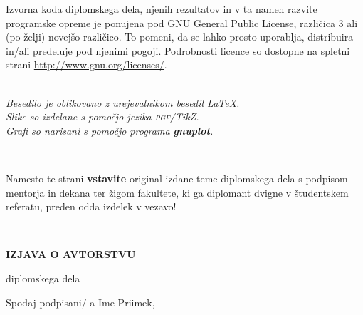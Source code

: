 \documentclass[12pt,a4paper,openany]{book}
\newcommand{\gnuplot}{\textbf{gnuplot}}
\newcommand{\pgfname}{\textsc{pgf}}
\newcommand{\tikzname}{Ti\emph{k}Z}
\begin{document}
\vspace*{1.5cm}
{\small \noindent
Izvorna koda diplomskega dela, njenih rezultatov in v ta namen razvite programske opreme je ponujena pod GNU General Public License,
različica 3 ali (po želji) novejšo različico. To pomeni, da se lahko prosto uporablja, distribuira in/ali predeluje pod njenimi pogoji.
Podrobnosti licence so dostopne na spletni strani \url{http://www.gnu.org/licenses/}.
}

\begin{center} 
\ \\ \vfill
{\em
Besedilo je oblikovano z urejevalnikom besedil \LaTeX. \\ Slike so izdelane s pomočjo jezika \pgfname/\tikzname. \\ Grafi so narisani
s pomočjo programa \gnuplot.}
\end{center}

\newpage

\ \thispagestyle{empty}

\newpage


\thispagestyle{empty}

Namesto te strani {\bf vstavite} original izdane teme diplomskega dela s podpisom mentorja in dekana ter \v zigom fakultete, ki ga diplomant
dvigne v študent\-skem referatu,  preden odda izdelek v vezavo!

\newpage


\ \thispagestyle{empty}

\newpage



\thispagestyle{empty}

\vspace{1cm}
\begin{center} 
{\Large \textbf{IZJAVA O AVTORSTVU}}
\end{center}

\begin{center} 
{\Large diplomskega dela}
\end{center}

\vspace{1cm}
Spodaj podpisani/-a \hspace{0.5cm} Ime Priimek,
\end{document}
